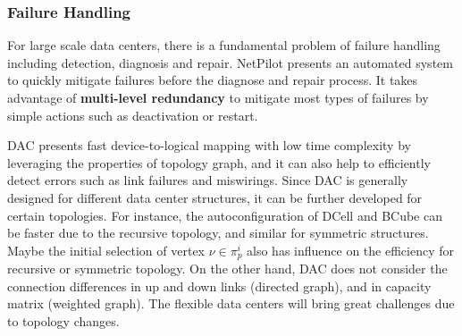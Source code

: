 \documentclass[journal,onecolumn,11pt]{IEEEtran}
\begin{document}
\subsubsection{Failure Handling}

For large scale data centers, there is a fundamental problem of failure handling including detection, diagnosis and repair. NetPilot \cite{Wu:2012:NAD:2342356.2342438} presents an automated system to quickly mitigate failures before the diagnose and repair process. It takes advantage of \textbf{multi-level redundancy} to mitigate most types of failures by simple actions such as deactivation or restart.

DAC \cite{Chen:2010:GAA:1851182.1851190} presents fast device-to-logical mapping with low time complexity by leveraging the properties of topology graph, and it can also help to efficiently detect errors such as link failures and miswirings. Since DAC is generally designed for different data center structures, it can be further developed for certain topologies. For instance, the autoconfiguration of DCell and BCube can be faster due to the recursive topology, and similar for symmetric structures. Maybe the initial selection of vertex $\nu\in\pi_p^i$ also has influence on the efficiency for recursive or symmetric topology. On the other hand, DAC does not consider the connection differences in up and down links (directed graph), and in capacity matrix (weighted graph). The flexible data centers will bring great challenges due to topology changes.

\end{document}
